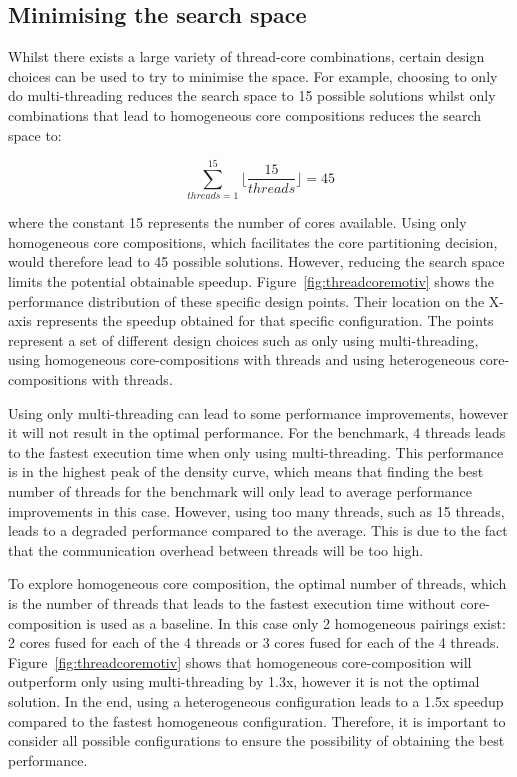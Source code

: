 \subsection{Minimising the search space}
Whilst there exists a large variety of thread-core combinations, certain design choices can be used to try to minimise the space.
For example, choosing to only do multi-threading reduces the search space to 15 possible solutions whilst only combinations that lead to homogeneous core compositions reduces the search space to:

\begin{equation}
\sum_{threads=1}^{15} \lfloor\frac{15}{threads}\rfloor= 45
\end{equation}

where the constant 15 represents the number of cores available.
Using only homogeneous core compositions, which facilitates the core partitioning decision, would therefore lead to 45 possible solutions.
However, reducing the search space limits the potential obtainable speedup.
Figure~\ref{fig:threadcoremotiv} shows the performance distribution of these specific design points.
Their location on the X-axis represents the speedup obtained for that specific configuration.
The points represent a set of different design choices such as only using multi-threading, using homogeneous core-compositions with threads and using heterogeneous core-compositions with threads.

Using only multi-threading can lead to some performance improvements, however it will not result in the optimal performance.
For the  benchmark, 4 threads leads to the fastest execution time when only using multi-threading.
This performance is in the highest peak of the density curve, which means that finding the best number of threads for the benchmark will only lead to average performance improvements in this case.
However, using too many threads, such as 15 threads, leads to a degraded performance compared to the average.
This is due to the fact that the communication overhead between threads will be too high.

To explore homogeneous core composition, the optimal number of threads, which is the number of threads that leads to the fastest execution time without core-composition is used as a baseline.
In this case only 2 homogeneous pairings exist: 2 cores fused for each of the 4 threads or 3 cores fused for each of the 4 threads.
Figure~\ref{fig:threadcoremotiv} shows that homogeneous core-composition will outperform only using multi-threading by 1.3x, however it is not the optimal solution.
In the end, using a heterogeneous configuration leads to a 1.5x speedup compared to the fastest homogeneous configuration.
Therefore, it is important to consider all possible configurations to ensure the possibility of obtaining the best performance.

